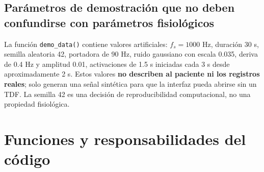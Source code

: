 \documentclass[11pt,spanish]{article}
\begin{document}
\subsection{Parámetros de demostración que no deben confundirse con parámetros fisiológicos}

La función \texttt{demo\_data()} contiene valores artificiales: $f_s=1000$ Hz, duración 30 s, semilla aleatoria 42, portadora de 90 Hz, ruido gaussiano con escala 0.035, deriva de 0.4 Hz y amplitud 0.01, activaciones de 1.5 s iniciadas cada 3 s desde aproximadamente 2 s. Estos valores \textbf{no describen al paciente ni los registros reales}; solo generan una señal sintética para que la interfaz pueda abrirse sin un TDF.
La semilla 42 es una decisión de reproducibilidad computacional, no una propiedad fisiológica.

\section{Funciones y responsabilidades del código}
\end{document}
